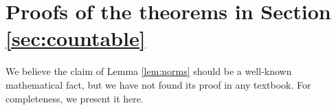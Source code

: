 \documentclass[11pt]{article}
\newcommand{\X}{\mathcal{X}}
\newcommand{\M}{\mathcal{M}}
\newcommand{\V}{\mathcal{V}}
\newtheorem{remark}{Remark}
\theoremstyle{definition}
\numberwithin{equation}{section}
\begin{document}
\section{Proofs of the theorems in Section \ref{sec:countable}}\label{sec:proofs}



%





 We believe the claim of  Lemma \ref{lem:norms} should be a well-known mathematical fact, but we have not found its proof in any textbook. For completeness, we present it here.
\end{document}
